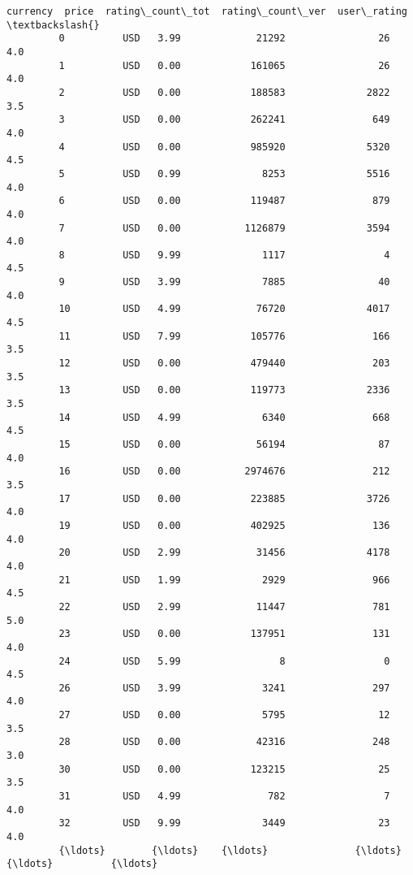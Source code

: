\documentclass[11pt]{article}
\begin{document}
\begin{Verbatim}[commandchars=\\\{\}]
               currency  price  rating\_count\_tot  rating\_count\_ver  user\_rating  \textbackslash{}
         0          USD   3.99             21292                26          4.0   
         1          USD   0.00            161065                26          4.0   
         2          USD   0.00            188583              2822          3.5   
         3          USD   0.00            262241               649          4.0   
         4          USD   0.00            985920              5320          4.5   
         5          USD   0.99              8253              5516          4.0   
         6          USD   0.00            119487               879          4.0   
         7          USD   0.00           1126879              3594          4.0   
         8          USD   9.99              1117                 4          4.5   
         9          USD   3.99              7885                40          4.0   
         10         USD   4.99             76720              4017          4.5   
         11         USD   7.99            105776               166          3.5   
         12         USD   0.00            479440               203          3.5   
         13         USD   0.00            119773              2336          3.5   
         14         USD   4.99              6340               668          4.5   
         15         USD   0.00             56194                87          4.0   
         16         USD   0.00           2974676               212          3.5   
         17         USD   0.00            223885              3726          4.0   
         19         USD   0.00            402925               136          4.0   
         20         USD   2.99             31456              4178          4.0   
         21         USD   1.99              2929               966          4.5   
         22         USD   2.99             11447               781          5.0   
         23         USD   0.00            137951               131          4.0   
         24         USD   5.99                 8                 0          4.5   
         26         USD   3.99              3241               297          4.0   
         27         USD   0.00              5795                12          3.5   
         28         USD   0.00             42316               248          3.0   
         30         USD   0.00            123215                25          3.5   
         31         USD   4.99               782                 7          4.0   
         32         USD   9.99              3449                23          4.0   
         {\ldots}        {\ldots}    {\ldots}               {\ldots}               {\ldots}          {\ldots}   

\end{Verbatim}
\end{document}
